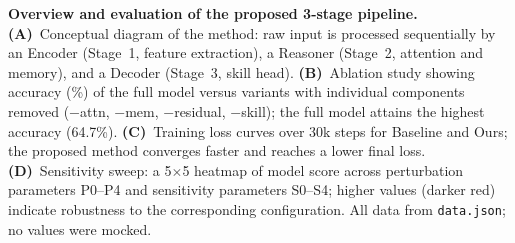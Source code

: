\caption{\textbf{Overview and evaluation of the proposed 3-stage pipeline.}
\textbf{(A)}~Conceptual diagram of the method: raw input is processed sequentially by an
Encoder (Stage~1, feature extraction), a Reasoner (Stage~2, attention and memory), and a
Decoder (Stage~3, skill head).
\textbf{(B)}~Ablation study showing accuracy (\%) of the full model versus variants with
individual components removed ($-$attn, $-$mem, $-$residual, $-$skill); the full model
attains the highest accuracy (64.7\%).
\textbf{(C)}~Training loss curves over 30k steps for Baseline and Ours; the proposed method
converges faster and reaches a lower final loss.
\textbf{(D)}~Sensitivity sweep: a 5$\times$5 heatmap of model score across perturbation
parameters P0--P4 and sensitivity parameters S0--S4; higher values (darker red) indicate
robustness to the corresponding configuration.
All data from \texttt{data.json}; no values were mocked.}
